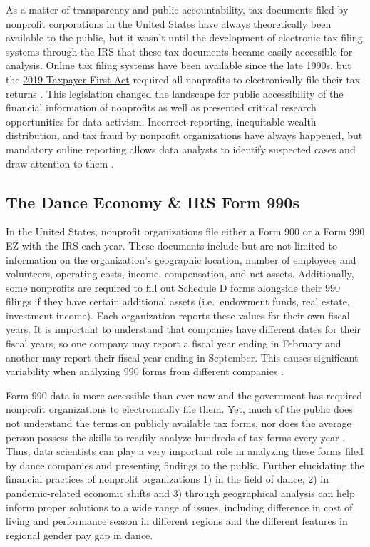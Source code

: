 \documentclass[Dance Data
Project,article,submit,moreauthors,pdftex]{mdpi}
\begin{document}
As a matter of transparency and public accountability, tax documents
filed by nonprofit corporations in the United States have always
theoretically been available to the public, but it wasn't until the
development of electronic tax filing systems through the IRS that these
tax documents became easily accessible for analysis. Online tax filing
systems have been available since the late 1990s, but the
\href{https://www.congress.gov/bill/116th-congress/house-bill/3151}{2019
Taxpayer First Act} required all nonprofits to electronically file their
tax returns \citep{ely_research_2023}. This legislation changed the
landscape for public accessibility of the financial information of
nonprofits as well as presented critical research opportunities for data
activism. Incorrect reporting, inequitable wealth distribution, and tax
fraud by nonprofit organizations have always happened, but mandatory
online reporting allows data analysts to identify suspected cases and
draw attention to them \citep{ely_research_2023}.

\hypertarget{the-dance-economy-irs-form-990s}{%
\subsection{The Dance Economy \& IRS Form
990s}\label{the-dance-economy-irs-form-990s}}

In the United States, nonprofit organizations file either a Form 900 or
a Form 990 EZ with the IRS each year. These documents include but are
not limited to information on the organization's geographic location,
number of employees and volunteers, operating costs, income,
compensation, and net assets. Additionally, some nonprofits are required
to fill out Schedule D forms alongside their 990 filings if they have
certain additional assets (i.e.~endowment funds, real estate, investment
income). Each organization reports these values for their own fiscal
years. It is important to understand that companies have different dates
for their fiscal years, so one company may report a fiscal year ending
in February and another may report their fiscal year ending in
September. This causes significant variability when analyzing 990 forms
from different companies \citep{ely_research_2023}.

Form 990 data is more accessible than ever now and the government has
required nonprofit organizations to electronically file them. Yet, much
of the public does not understand the terms on publicly available tax
forms, nor does the average person possess the skills to readily analyze
hundreds of tax forms every year \citep{lamothe_examining_2023}. Thus,
data scientists can play a very important role in analyzing these forms
filed by dance companies and presenting findings to the public. Further
elucidating the financial practices of nonprofit organizations 1) in the
field of dance, 2) in pandemic-related economic shifts and 3) through
geographical analysis can help inform proper solutions to a wide range
of issues, including difference in cost of living and performance season
in different regions and the different features in regional gender pay
gap in dance.
\end{document}

